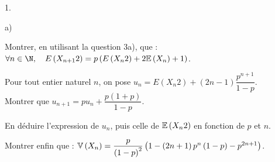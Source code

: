 \documentclass[11pt]{article}%
\begin{document}
\begin{noliste}{1.}
\item 

\begin{noliste}{a)}
 \setlength{\itemsep}{2mm}
\item Montrer, en utilisant la question 3a), que : $\forall n\in
\N,\quad E\left( X_{n + 1}{2}\right) = p\left( E\left( X_{n}{2}\right)
+ 2\E\left(
X_{n}\right) + 1\right) $.

\item Pour tout entier naturel $n$, on pose $u_{n} = E\left(
X_{n}{2}\right)
 + \left( 2n-1\right) \dfrac{p^{n + 1}}{1-p}$. \\
Montrer que $u_{n + 1} = pu_{n} + \dfrac{p\left( 1 + p\right) }{1-p}$.

\item En déduire l'expression de $u_{n}$, puis celle de $\mathbb{E}\left(
X_{n}{2}\right) $ en fonction de $p$ et $n$.

\item Montrer enfin que : $\mathbb{V}\left( X_{n}\right) = \dfrac{p}{\left(
1-p\right)
^{2}}\left( 1-\left( 2n + 1\right) p^{n}\left( 1-p\right) -p^{2n +
1}\right) $.
\end{noliste}
\end{noliste}

\label{fin}
\end{document}
